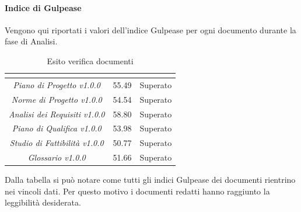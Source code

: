 \paragraph{Indice di Gulpease} \Spazio
Vengono qui riportati i valori dell'indice Gulpease per ogni documento durante la fase di Analisi. 
\renewcommand{\arraystretch}{1.5}
\begin{table}[H]
\begin{center}
\begin{tabular}{|c|c|c|}
\hline
\rowcolor{title_row}
\textbf{\color{title_text}{Documento}} & \textbf{\color{title_text}{Valore indice}} & \textbf{\color{title_text}{Esito}} \\
\hline
	\emph{Piano di Progetto v1.0.0} & {55.49} & {Superato}\\
\hline
	\emph{Norme di Progetto v1.0.0} & {54.54} & {Superato}\\
\hline
	\emph{Analisi dei Requisiti v1.0.0} & {58.80} & {Superato}\\
\hline
	\emph{Piano di Qualifica v1.0.0} & {53.98} & {Superato}\\
\hline
	\emph{Studio di Fattibilità v1.0.0} & {50.77} & {Superato}\\
\hline
	\emph{Glossario v1.0.0} & {51.66} & {Superato}\\
\hline
\end{tabular}
\caption[Esiti verifica documenti, Analisi]{Esito verifica documenti}
\label{tabella:verifica documenti}
\end{center}
\end{table}
\renewcommand{\arraystretch}{1}

Dalla tabella si può notare come tutti gli indici Gulpease dei documenti rientrino nei vincoli dati. Per questo motivo i documenti redatti hanno raggiunto la leggibilità desiderata.


